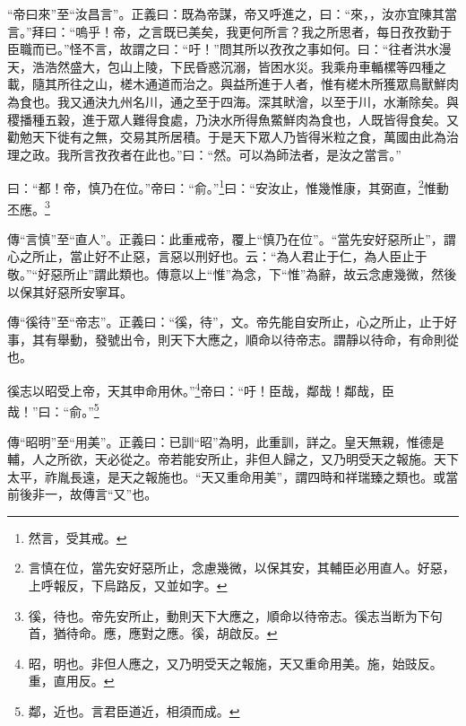 {\noindent\shu{}\fzkt “帝曰來”至“汝昌言”。正義曰：既為帝謀，帝又呼進之，曰：“來，，汝亦宜陳其當言。”拜曰：“嗚乎！帝，之言既已美矣，我更何所言？我之所思者，每日孜孜勤于臣職而已。”怪不言，故謂之曰：“吁！”問其所以孜孜之事如何。曰：“往者洪水漫天，浩浩然盛大，包山上陵，下民昏惑沉溺，皆困水災。我乘舟車輴樏等四種之載，隨其所往之山，槎木通道而治之。與益所進于人者，惟有槎木所獲眾鳥獸鮮肉為食也。我又通決九州名川，通之至于四海。深其畎澮，以至于川，水漸除矣。與稷播種五穀，進于眾人難得食處，乃決水所得魚鱉鮮肉為食也，人既皆得食矣。又勸勉天下徙有之無，交易其所居積。于是天下眾人乃皆得米粒之食，萬國由此為治理之政。我所言孜孜者在此也。”曰：“然。可以為師法者，是汝之當言。” \par}

曰：“都！帝，慎乃在位。”帝曰：“俞。”\footnote{然言，受其戒。}曰：“安汝止，惟幾惟康，其弼直，\footnote{言慎在位，當先安好惡所止，念慮幾微，以保其安，其輔臣必用直人。好惡，上呼報反，下烏路反，又並如字。}惟動丕應。\footnote{徯，待也。帝先安所止，動則天下大應之，順命以待帝志。徯志当断为下句首，猶待命。應，應對之應。徯，胡啟反。}


{\noindent\zhuan{}\fzbyks 傳“言慎”至“直人”。正義曰：此重戒帝，覆上“慎乃在位”。“當先安好惡所止”，謂心之所止，當止好不止惡，言惡以刑好也。云：“為人君止于仁，為人臣止于敬。”“好惡所止”謂此類也。傳意以上“惟”為念，下“惟”為辭，故云念慮幾微，然後以保其好惡所安寧耳。 \par}

{\noindent\zhuan{}\fzbyks 傳“徯待”至“帝志”。正義曰：“徯，待”，文。帝先能自安所止，心之所止，止于好事，其有舉動，發號出令，則天下大應之，順命以待帝志。謂靜以待命，有命則從也。 \par}

徯志以昭受上帝，天其申命用休。”\footnote{昭，明也。非但人應之，又乃明受天之報施，天又重命用美。施，始豉反。重，直用反。}帝曰：“吁！臣哉，鄰哉！鄰哉，臣哉！”曰：“俞。”\footnote{鄰，近也。言君臣道近，相須而成。}

{\noindent\zhuan{}\fzbyks 傳“昭明”至“用美”。正義曰：已訓“昭”為明，此重訓，詳之。皇天無親，惟德是輔，人之所欲，天必從之。帝若能安所止，非但人歸之，又乃明受天之報施。天下太平，祚胤長遠，是天之報施也。“天又重命用美”，謂四時和祥瑞臻之類也。或當前後非一，故傳言“又”也。 \par}

